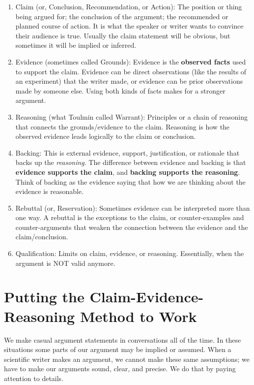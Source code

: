 \documentclass[
]{book}
\begin{document}
\begin{enumerate}
\def\labelenumi{\arabic{enumi}.}
\item
  Claim (or, Conclusion, Recommendation, or Action):
  The position or thing being argued for; the conclusion of the argument; the recommended or planned course of action. It is what the speaker or writer wants to convince their audience is true. Usually the claim statement will be obvious, but sometimes it will be implied or inferred.
\item
  Evidence (sometimes called Grounds):
  Evidence is the \textbf{observed facts} used to support the claim. Evidence can be direct observations (like the results of an experiment) that the writer made, or evidence can be prior observations made by someone else. Using both kinds of facts makes for a stronger argument.
\item
  Reasoning (what Toulmin called Warrant):
  Principles or a chain of reasoning that connects the grounds/evidence to the claim. Reasoning is how the observed evidence leads logically to the claim or conclusion.
\item
  Backing:
  This is external evidence, support, justification, or rationale that backs up the \emph{reasoning}. The difference between evidence and backing is that \textbf{evidence supports the claim}, and \textbf{backing supports the reasoning}. Think of backing as the evidence saying that how we are thinking about the evidence is reasonable.
\item
  Rebuttal (or, Reservation):
  Sometimes evidence can be interpreted more than one way. A rebuttal is the exceptions to the claim, or counter-examples and counter-arguments that weaken the connection between the evidence and the claim/conclusion.
\item
  Qualification:
  Limits on claim, evidence, or reasoning. Essentially, when the argument is NOT valid anymore.
\end{enumerate}

\hypertarget{putting-the-claim-evidence-reasoning-method-to-work}{%
\section{Putting the Claim-Evidence-Reasoning Method to Work}\label{putting-the-claim-evidence-reasoning-method-to-work}}

We make casual argument statements in conversations all of the time. In these situations some parts of our argument may be implied or assumed. When a scientific writer makes an argument, we cannot make these same assumptions; we have to make our arguments sound, clear, and precise. We do that by paying attention to details.
\end{document}
